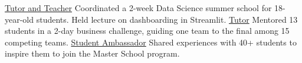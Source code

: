 
\begin{cvprojects}
  \cvproject
    {\href{https://www.linkedin.com/in/marcodifran/details/volunteering-experiences/}{Tutor and Teacher}}
    {Coordinated a 2-week Data Science summer school for 18-year-old students. Held lecture on dashboarding in Streamlit.}
    {}
    {}
  \cvproject
    {\href{https://www.linkedin.com/in/marcodifran/details/volunteering-experiences/}{Tutor}}
    {Mentored 13 students in a 2-day business challenge, guiding one team to the final among 15 competing teams.}
    {}
    {}
  \cvproject
    {\href{https://www.linkedin.com/in/marcodifran/details/volunteering-experiences/}{Student Ambassador}}
    {Shared experiences with 40+ students to inspire them to join the Master School program.}
    {}
    {}
\end{cvprojects}

